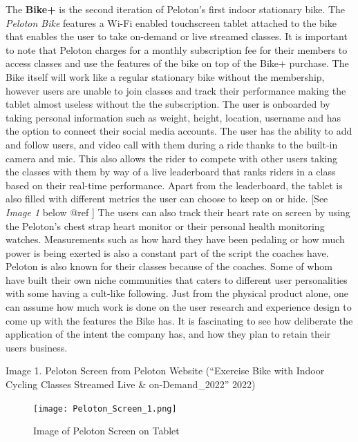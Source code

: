 \documentclass[
]{article}
\begin{document}
The \textbf{Bike+} is the second iteration of Peloton's first indoor stationary bike. The \emph{Peloton Bike} features a Wi-Fi enabled touchscreen tablet attached to the bike that enables the user to take on-demand or live streamed classes. It is important to note that Peloton charges for a monthly subscription fee for their members to access classes and use the features of the bike on top of the Bike+ purchase. The Bike itself will work like a regular stationary bike without the membership, however users are unable to join classes and track their performance making the tablet almost useless without the the subscription. The user is onboarded by taking personal information such as weight, height, location, username and has the option to connect their social media accounts. The user has the ability to add and follow users, and video call with them during a ride thanks to the built-in camera and mic. This also allows the rider to compete with other users taking the classes with them by way of a live leaderboard that ranks riders in a class based on their real-time performance. Apart from the leaderboard, the tablet is also filled with different metrics the user can choose to keep on or hide. {[}See \emph{Image 1} below @ref {]} The users can also track their heart rate on screen by using the Peloton's chest strap heart monitor or their personal health monitoring watches. Measurements such as how hard they have been pedaling or how much power is being exerted is also a constant part of the script the coaches have. Peloton is also known for their classes because of the coaches. Some of whom have built their own niche communities that caters to different user personalities with some having a cult-like following. Just from the physical product alone, one can assume how much work is done on the user research and experience design to come up with the features the Bike has. It is fascinating to see how deliberate the application of the intent the company has, and how they plan to retain their users business.

Image 1. Peloton Screen from Peloton Website ({``Exercise Bike with Indoor Cycling Classes Streamed Live \& on-Demand\_2022''} 2022)

\begin{figure}
\centering
\texttt{[image: Peloton\_Screen\_1.png]}
\caption{Image of Peloton Screen on Tablet}
\end{figure}
\end{document}
